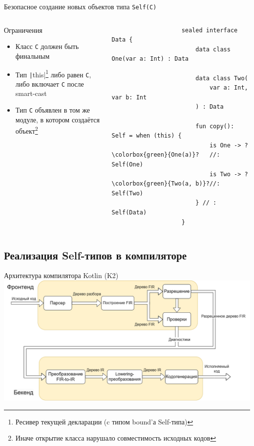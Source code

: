 \documentclass[aspectratio=169,usenames,dvipsnames]{beamer}
\begin{document}
    \begin{frame}[fragile]{Безопасное создание новых объектов типа \texttt{Self(C)}}
        \begin{columns}[onlytextwidth]
            \begin{column}[t]{0.46\textwidth}
                \begin{block}{Ограничения}
                    \begin{itemize}
                        \item Класс \texttt{C} должен быть финальным
                        \item Тип \texttt|this|\footnote{Ресивер текущей декларации (c типом bound'а Self-типа)} либо равен \texttt{С}, либо включает \texttt{C} после smart-cast
                        \item Тип \texttt{C} объявлен в том же модуле, в котором создаётся объект\footnote{Иначе открытие класса нарушало совместимость исходных кодов}
                    \end{itemize}
                \end{block}
            \end{column}\hfill%
            \begin{column}[t]{0.50\textwidth}
                \begin{verbatim}
                    sealed interface Data {
                        data class One(var a: Int) : Data

                        data class Two(
                            var a: Int, var b: Int
                        ) : Data

                        fun copy(): Self = when (this) {
                            is One -> ?\colorbox{green}{One(a)}?   //: Self(One)
                            is Two -> ?\colorbox{green}{Two(a, b)}?//: Self(Two)
                        } // : Self(Data)
                    }
                \end{verbatim}
            \end{column}
        \end{columns}
    \end{frame}


    \subsection{Реализация Self-типов в компиляторе}

    \begin{frame}{Архитектура компилятора Kotlin (K2)}
        \includegraphics[width=\textwidth]{fig/arch}
    \end{frame}
\end{document}
